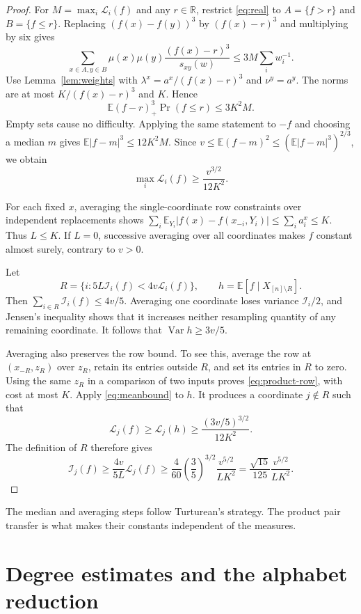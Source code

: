 \documentclass[11pt,reqno]{amsart}
\theoremstyle{definition}
\theoremstyle{remark}
\newcommand{\E}{\mathbb E}
\newcommand{\R}{\mathbb R}
\newcommand{\Var}{\operatorname{Var}}
\newcommand{\cI}{\mathcal I}
\newcommand{\cL}{\mathcal L}
\numberwithin{equation}{section}
\begin{document}
\begin{proof}
For $M=\max_i\cL_i(f)$ and any $r\in\R$, restrict \eqref{eq:real} to
$A=\{f>r\}$ and $B=\{f\le r\}$. Replacing $(f(x)-f(y))^3$ by
$(f(x)-r)^3$ and multiplying by six gives
\[
 \sum_{x\in A,y\in B}\mu(x)\mu(y)
 \frac{(f(x)-r)^3}{s_{xy}(w)}\le3M\sum_iw_i^{-1}.
\]
Use Lemma~\ref{lem:weights} with
$\lambda^x=a^x/(f(x)-r)^3$ and $\nu^y=a^y$. The norms are at most
$K/(f(x)-r)^3$ and $K$. Hence
\begin{equation}\label{eq:third}
 \E(f-r)_+^3\Pr(f\le r)\le3K^2M.
\end{equation}
Empty sets cause no difficulty. Applying the same statement to $-f$
and choosing a median $m$ gives
$\E|f-m|^3\le12K^2M$. Since
$v\le\E(f-m)^2\le(\E|f-m|^3)^{2/3}$, we obtain
\begin{equation}\label{eq:meanbound}
 \max_i\cL_i(f)\ge\frac{v^{3/2}}{12K^2}.
\end{equation}

For each fixed $x$, averaging the single-coordinate row constraints over
independent replacements shows
$\sum_i\E_{Y_i}|f(x)-f(x_{-i},Y_i)|\le\sum_i a_i^x\le K$.
Thus $L\le K$. If $L=0$, successive averaging over all coordinates makes
$f$ constant almost surely, contrary to $v>0$.

Let
\[
 R=\{i:5L\cI_i(f)<4v\cL_i(f)\},\qquad h=\E[f\mid X_{[n]\setminus R}].
\]
Then $\sum_{i\in R}\cI_i(f)\le4v/5$.
Averaging one coordinate loses variance $\cI_i/2$, and Jensen's inequality
shows that it increases neither resampling quantity of any remaining
coordinate. It follows that $\Var h\ge3v/5$.

Averaging also preserves the row bound. To see this, average the row at
$(x_{-R},z_R)$ over $z_R$, retain its entries outside $R$, and set its
entries in $R$ to zero. Using the same $z_R$ in a comparison of two
inputs proves \eqref{eq:product-row}, with cost at most $K$.
Apply \eqref{eq:meanbound} to $h$. It produces a coordinate $j\notin R$
such that
\[
 \cL_j(f)\ge\cL_j(h)\ge\frac{(3v/5)^{3/2}}{12K^2}.
\]
The definition of $R$ therefore gives
\[
 \cI_j(f)\ge\frac{4v}{5L}\cL_j(f)
 \ge\frac{4}{60}\left(\frac35\right)^{3/2}\frac{v^{5/2}}{LK^2}
 =\frac{\sqrt{15}}{125}\frac{v^{5/2}}{LK^2}.
\]
\end{proof}

The median and averaging steps follow Turturean's strategy. The product
pair transfer is what makes their constants independent of the measures.

\section{Degree estimates and the alphabet reduction}
\end{document}
